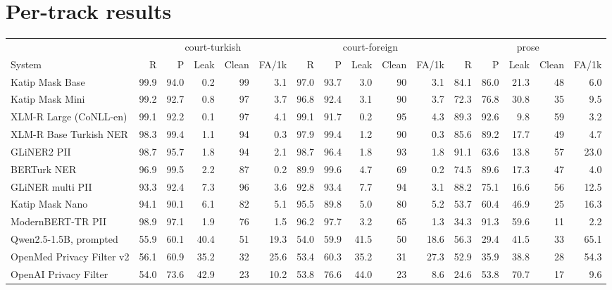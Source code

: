 \documentclass[10pt,twocolumn]{article}
\begin{document}
\section{Per-track results}
\label{app:tracks}
\begin{table}[h]
\centering\footnotesize
\setlength{\tabcolsep}{2.6pt}
\begin{tabular}{@{}l rrrrr rrrrr rrrrr@{}}
\toprule
& \multicolumn{5}{c}{court-turkish} & \multicolumn{5}{c}{court-foreign} & \multicolumn{5}{c}{prose} \\
\cmidrule(lr){2-6}\cmidrule(lr){7-11}\cmidrule(lr){12-16}
System & R & P & Leak & Clean & FA/1k & R & P & Leak & Clean & FA/1k & R & P & Leak & Clean & FA/1k \\
\midrule
Katip Mask Base & 99.9 & 94.0 & 0.2 & 99 & 3.1 & 97.0 & 93.7 & 3.0 & 90 & 3.1 & 84.1 & 86.0 & 21.3 & 48 & 6.0 \\
Katip Mask Mini & 99.2 & 92.7 & 0.8 & 97 & 3.7 & 96.8 & 92.4 & 3.1 & 90 & 3.7 & 72.3 & 76.8 & 30.8 & 35 & 9.5 \\
XLM-R Large (CoNLL-en) & 99.1 & 92.2 & 0.1 & 97 & 4.1 & 99.1 & 91.7 & 0.2 & 95 & 4.3 & 89.3 & 92.6 & 9.8 & 59 & 3.2 \\
XLM-R Base Turkish NER & 98.3 & 99.4 & 1.1 & 94 & 0.3 & 97.9 & 99.4 & 1.2 & 90 & 0.3 & 85.6 & 89.2 & 17.7 & 49 & 4.7 \\
GLiNER2 PII & 98.7 & 95.7 & 1.8 & 94 & 2.1 & 98.7 & 96.4 & 1.8 & 93 & 1.8 & 91.1 & 63.6 & 13.8 & 57 & 23.0 \\
BERTurk NER & 96.9 & 99.5 & 2.2 & 87 & 0.2 & 89.9 & 99.6 & 4.7 & 69 & 0.2 & 74.5 & 89.6 & 17.3 & 47 & 4.0 \\
GLiNER multi PII & 93.3 & 92.4 & 7.3 & 96 & 3.6 & 92.8 & 93.4 & 7.7 & 94 & 3.1 & 88.2 & 75.1 & 16.6 & 56 & 12.5 \\
Katip Mask Nano & 94.1 & 90.1 & 6.1 & 82 & 5.1 & 95.5 & 89.8 & 5.0 & 80 & 5.2 & 53.7 & 60.4 & 46.9 & 25 & 16.3 \\
ModernBERT-TR PII & 98.9 & 97.1 & 1.9 & 76 & 1.5 & 96.2 & 97.7 & 3.2 & 65 & 1.3 & 34.3 & 91.3 & 59.6 & 11 & 2.2 \\
Qwen2.5-1.5B, prompted & 55.9 & 60.1 & 40.4 & 51 & 19.3 & 54.0 & 59.9 & 41.5 & 50 & 18.6 & 56.3 & 29.4 & 41.5 & 33 & 65.1 \\
OpenMed Privacy Filter v2 & 56.1 & 60.9 & 35.2 & 32 & 25.6 & 53.4 & 60.3 & 35.2 & 31 & 27.3 & 52.9 & 35.9 & 38.8 & 28 & 54.3 \\
OpenAI Privacy Filter & 54.0 & 73.6 & 42.9 & 23 & 10.2 & 53.8 & 76.6 & 44.0 & 23 & 8.6 & 24.6 & 53.8 & 70.7 & 17 & 9.6 \\

\end{tabular}
\end{table}
\end{document}
